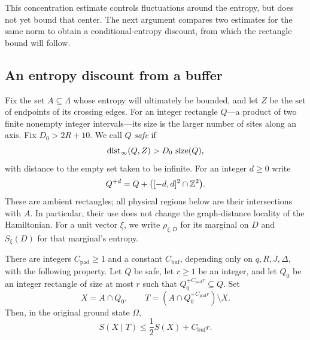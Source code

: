 This concentration estimate controls fluctuations around the entropy,
but does not yet bound that center.  The next argument compares two
estimates for the same norm to obtain a conditional-entropy discount,
from which the rectangle bound will follow.

\subsection{An entropy discount from a buffer}

Fix the set $A\subseteq\Lambda$ whose entropy will ultimately be
bounded, and let $Z$ be the set of endpoints of its crossing edges.
For an integer rectangle $Q$---a product of two finite nonempty integer
intervals---its size is the larger number of sites along an axis.
Fix $D_0>2R+10$.  We call $Q$ \emph{safe} if
\[
 \operatorname{dist}_\infty(Q,Z)>D_0\,\operatorname{size}(Q),
\]
with distance to the empty set taken to be infinite.  For an integer
$d\ge0$ write
\[
 Q^{+d}=Q+\bigl([-d,d]^2\cap\mathbb Z^2\bigr).
\]
These are ambient rectangles; all physical regions below are their
intersections with $A$.  In particular, their use does not change the
graph-distance locality of the Hamiltonian.  For a unit vector $\xi$,
we write $\rho_{\xi,D}$ for its marginal on $D$ and $S_\xi(D)$ for
that marginal's entropy.

\begin{lemma}
\label{lem:initial-buffer}
There are integers $C_{\mathrm{pad}}\ge1$ and a constant
$C_{\mathrm{buf}}$, depending only on $q,R,J,\Delta$, with the following
property.  Let $Q$ be safe, let $r\ge1$ be an integer, and let $Q_0$ be
an integer rectangle of size at most $r$ such that
$Q_0^{+C_{\mathrm{pad}}r}\subseteq Q$.  Set
\[
 X=A\cap Q_0,\qquad
 T=(A\cap Q_0^{+C_{\mathrm{pad}}r})\setminus X.
\]
Then, in the original ground state $\Omega$,
\begin{equation}
 S(X\mid T)\le\frac12S(X)+C_{\mathrm{buf}}r.
 \label{eq:initial-buffer-discount}
\end{equation}
\end{lemma}

